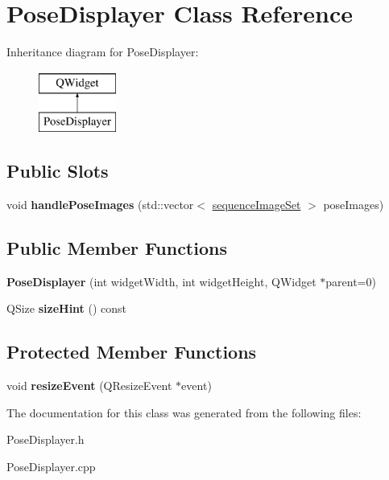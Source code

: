 \hypertarget{class_pose_displayer}{\section{Pose\+Displayer Class Reference}
\label{class_pose_displayer}
}
Inheritance diagram for Pose\+Displayer\+:\begin{figure}[H]
\begin{center}
\leavevmode
\includegraphics[height=2.000000cm]{class_pose_displayer}
\end{center}
\end{figure}
\subsection*{Public Slots}
\begin{DoxyCompactItemize}
\item 
\hypertarget{class_pose_displayer_aecd22b32ac50bd85ae85b230a170aa40}{void {\bfseries handle\+Pose\+Images} (std\+::vector$<$ \hyperlink{structsequence_image_set}{sequence\+Image\+Set} $>$ pose\+Images)}\label{class_pose_displayer_aecd22b32ac50bd85ae85b230a170aa40}

\end{DoxyCompactItemize}
\subsection*{Public Member Functions}
\begin{DoxyCompactItemize}
\item 
\hypertarget{class_pose_displayer_a4336244149931fcc4d83974e5ef79188}{{\bfseries Pose\+Displayer} (int widget\+Width, int widget\+Height, Q\+Widget $\ast$parent=0)}\label{class_pose_displayer_a4336244149931fcc4d83974e5ef79188}

\item 
\hypertarget{class_pose_displayer_aa6a9f27ba7e55f8337da42e290a3810e}{Q\+Size {\bfseries size\+Hint} () const }\label{class_pose_displayer_aa6a9f27ba7e55f8337da42e290a3810e}

\end{DoxyCompactItemize}
\subsection*{Protected Member Functions}
\begin{DoxyCompactItemize}
\item 
\hypertarget{class_pose_displayer_a12016e6a8a03bee7264f5bdad4f4501d}{void {\bfseries resize\+Event} (Q\+Resize\+Event $\ast$event)}\label{class_pose_displayer_a12016e6a8a03bee7264f5bdad4f4501d}

\end{DoxyCompactItemize}


The documentation for this class was generated from the following files\+:\begin{DoxyCompactItemize}
\item 
Pose\+Displayer.\+h\item 
Pose\+Displayer.\+cpp\end{DoxyCompactItemize}
